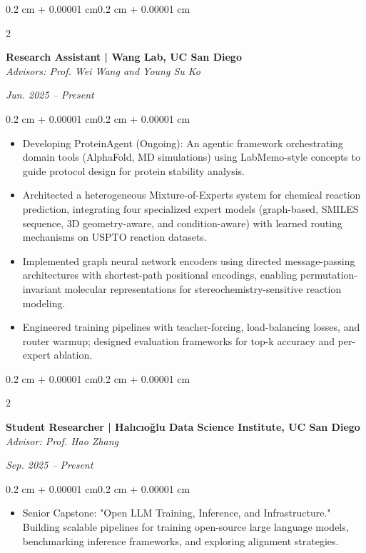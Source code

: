\documentclass[10pt, letterpaper]{article}
\newenvironment{highlights}{
    \begin{itemize}[
        topsep=0.10 cm,
        parsep=0.10 cm,
        partopsep=0pt,
        itemsep=0pt,
        leftmargin=0.4 cm + 10pt
    ]
}{\end{itemize}}
\newenvironment{onecolentry}{
    \begin{adjustwidth}{0.2 cm + 0.00001 cm}{0.2 cm + 0.00001 cm}
}{\end{adjustwidth}}
\newenvironment{twocolentry}[2][]{
    \onecolentry
    \def\secondColumn{#2}
    \setcolumnwidth{\fill, 4.5 cm}
    \begin{paracol}{2}
}{
    \switchcolumn \raggedleft \secondColumn
    \end{paracol}
    \endonecolentry
}
\begin{document}
    \begin{twocolentry}{\textit{Jun. 2025 -- Present}}
        \textbf{Research Assistant | Wang Lab, UC San Diego}\\
        \textit{Advisors: Prof. Wei Wang and Young Su Ko}
    \end{twocolentry}
    \vspace{0.10 cm}
    \begin{onecolentry}
        \begin{highlights}
            \item Developing ProteinAgent (Ongoing): An agentic framework orchestrating domain tools (AlphaFold, MD simulations) using LabMemo-style concepts to guide protocol design for protein stability analysis.
            \item Architected a heterogeneous Mixture-of-Experts system for chemical reaction prediction, integrating four specialized expert models (graph-based, SMILES sequence, 3D geometry-aware, and condition-aware) with learned routing mechanisms on USPTO reaction datasets.
            \item Implemented graph neural network encoders using directed message-passing architectures with shortest-path positional encodings, enabling permutation-invariant molecular representations for stereochemistry-sensitive reaction modeling.
            \item Engineered training pipelines with teacher-forcing, load-balancing losses, and router warmup; designed evaluation frameworks for top-k accuracy and per-expert ablation.
        \end{highlights}
    \end{onecolentry}
    \vspace{0.20 cm}

    \begin{twocolentry}{\textit{Sep. 2025 -- Present}}
        \textbf{Student Researcher | Halıcıo\u{g}lu Data Science Institute, UC San Diego}\\
        \textit{Advisor: Prof. Hao Zhang}
    \end{twocolentry}
    \vspace{0.10 cm}
    \begin{onecolentry}
        \begin{highlights}
            \item Senior Capstone: "Open LLM Training, Inference, and Infrastructure." Building scalable pipelines for training open-source large language models, benchmarking inference frameworks, and exploring alignment strategies.
        \end{highlights}
    \end{onecolentry}
    \vspace{0.20 cm}
\end{document}
